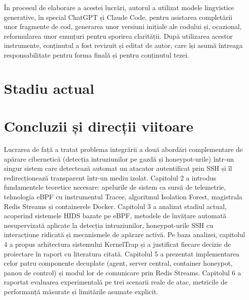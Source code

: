 \documentclass[12pt, a4paper]{report}
\begin{document}
\vspace{1em}
În procesul de elaborare a acestei lucrări, autorul a utilizat modele lingvistice generative, în special ChatGPT și Claude Code,
 pentru asistarea completării unor fragmente de cod, generarea unor versiuni inițiale ale codului și, ocazional, reformularea unor enunțuri pentru sporirea clarității.
  După utilizarea acestor instrumente, conținutul a fost revizuit și editat de autor, care își asumă întreaga responsabilitate pentru forma finală și pentru conținutul tezei.



\chapter{Stadiu actual}








\chapter{Concluzii și direcții viitoare}

Lucrarea de față a tratat problema integrării a două abordări complementare de
apărare cibernetică (detecția intruziunilor pe gazdă și honeypot-urile) într-un
singur sistem care detectează automat un atacator autentificat prin SSH și îl
redirecționează transparent într-un mediu izolat. Capitolul 2 a introdus
fundamentele teoretice necesare: apelurile de sistem ca sursă de telemetrie,
tehnologia eBPF cu instrumentul Tracee, algoritmul Isolation Forest, magistrala
Redis Streams și containerele Docker. Capitolul 3 a analizat stadiul actual,
acoperind sistemele HIDS bazate pe eBPF, metodele de învățare automată
nesupervizată aplicate la detecția intruziunilor, honeypot-urile SSH cu
interacțiune ridicată și mecanismele de apărare activă. Pe baza analizei,
capitolul 4 a propus arhitectura sistemului KernelTrap și a justificat fiecare
decizie de proiectare în raport cu literatura citată. Capitolul 5 a prezentat
implementarea celor patru componente decuplate (agent, server central, container
honeypot, panou de control) și modul lor de comunicare prin Redis Streams.
Capitolul 6 a raportat evaluarea experimentală pe trei scenarii reale
de atac, metricile de performanță măsurate și limitările asumate explicit.
\end{document}
